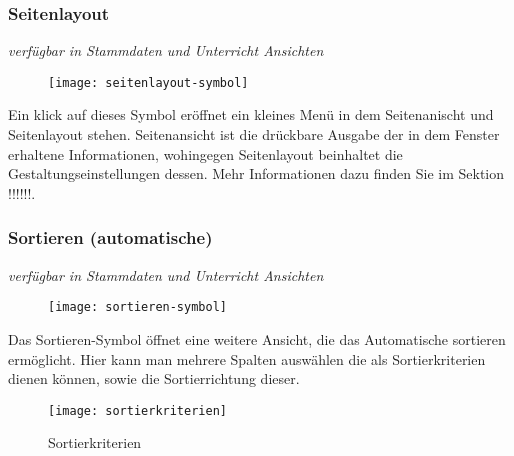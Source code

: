\subsubsection{Seitenlayout}
{\small\textit{verfügbar in Stammdaten und Unterricht Ansichten\\}\par}

\begin{wrapfigure}{r}{.06\textwidth}
	\vspace{-50pt}
	\texttt{[image: seitenlayout-symbol]}
	\vspace{-35pt}
\end{wrapfigure}

\noindent
Ein klick auf dieses Symbol eröffnet ein kleines Menü in dem Seitenanischt und Seitenlayout stehen. Seitenansicht ist die drückbare Ausgabe der in dem Fenster erhaltene Informationen, wohingegen Seitenlayout beinhaltet die Gestaltungseinstellungen dessen. Mehr Informationen dazu finden Sie im Sektion !!!!!!.

\subsubsection{Sortieren (automatische)}
{\small\textit{verfügbar in Stammdaten und Unterricht Ansichten\\}\par}

\begin{wrapfigure}{r}{.05\textwidth}
	\vspace{-50pt}
	\texttt{[image: sortieren-symbol]}
	\vspace{-35pt}
\end{wrapfigure}

\noindent
Das Sortieren-Symbol öffnet eine weitere Ansicht, die das Automatische sortieren ermöglicht. Hier kann man mehrere Spalten auswählen die als Sortierkriterien dienen können, sowie die Sortierrichtung dieser.\\

\begin{wrapfigure}{r}{0.3\textwidth}
	\vspace{-14pt}
	\texttt{[image: sortierkriterien]}
	\vspace{-15pt}
	\caption{Sortierkriterien}
	\label{fig:sortierkriterien}
\end{wrapfigure}

